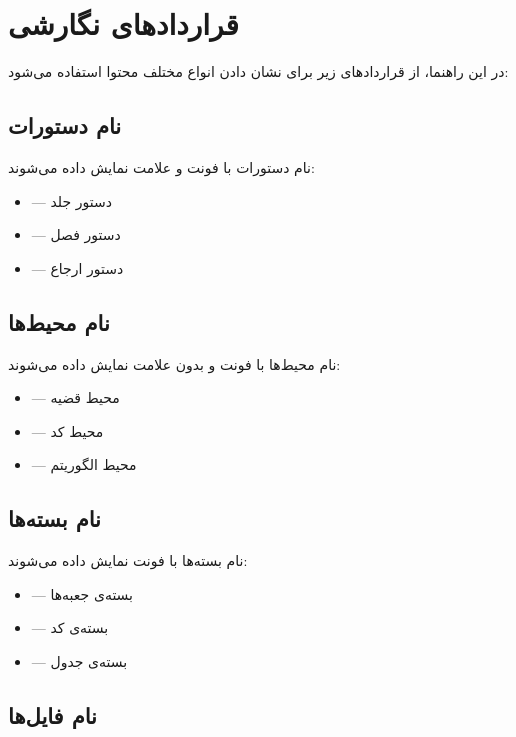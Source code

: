 \section*{قراردادهای نگارشی}

در این راهنما، از قراردادهای زیر برای نشان دادن
انواع مختلف محتوا استفاده می‌شود:

\subsection*{نام دستورات}

نام دستورات  با فونت  و
علامت \lr{\textbackslash} نمایش داده می‌شوند:

\begin{itemize}
    \item {} — دستور جلد
    \item {} — دستور فصل
    \item {} — دستور ارجاع
\end{itemize}

\subsection*{نام محیط‌ها}

نام محیط‌ها با فونت  و بدون
علامت \lr{\textbackslash} نمایش داده می‌شوند:

\begin{itemize}
    \item {} — محیط قضیه
    \item {} — محیط کد
    \item {} — محیط الگوریتم
\end{itemize}

\subsection*{نام بسته‌ها}

نام بسته‌ها با فونت  نمایش داده
می‌شوند:

\begin{itemize}
    \item {} — بسته‌ی جعبه‌ها
    \item {} — بسته‌ی کد
    \item {} — بسته‌ی جدول
\end{itemize}

\subsection*{نام فایل‌ها}

